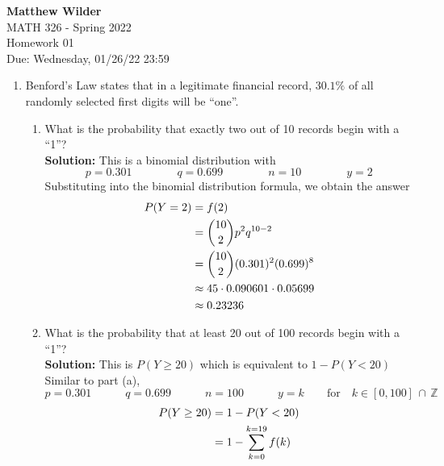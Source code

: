 \documentclass[12pt]{article}
\begin{document}
\pagestyle{fancy}
\fancyhf{}

\noindent \textbf{Matthew Wilder}\\MATH 326 - Spring 2022 \\
Homework 01 \\
Due: Wednesday, 01/26/22 23:59\\
\begin{enumerate}
    \item Benford's Law states that in a legitimate financial record, $30.1 \%$ of all randomly selected first digits will be \textquotedblleft one\textquotedblright.
    \begin{enumerate}
        \item What is the probability that exactly two out of 10 records begin with a \textquotedblleft 1\textquotedblright? \vspace{0.15in}\\
        \textbf{Solution:} This is a binomial distribution with
        $$p = 0.301 \qquad\qquad q = 0.699 \qquad\qquad n = 10 \qquad\qquad y = 2$$
        Substituting into the binomial distribution formula, we obtain the answer
        \begin{align}
            P(Y=2) &= f(2)\notag\\
            &= \binom{10}{2}p^2 q^{10-2} \notag\\
            &= \binom{10}{2}(0.301)^2  (0.699)^{8} \notag\\
            &\approx 45 \cdot 0.090601 \cdot 0.05699 \notag\\
            &\approx 0.23236\notag
        \end{align}
        \vspace{0.15in}
        \item What is the probability that at least 20 out of 100 records begin with a \textquotedblleft 1\textquotedblright?
        \vspace{0.15in}\\
        \textbf{Solution:} This is $P(Y \geq 20)$ which is equivalent to $1 - P(Y < 20)$ Similar to part (a),
        $$p = 0.301 \qquad\quad q = 0.699 \qquad\quad n = 100 \qquad\quad y = k \qquad \text{for} \quad k \in [0,100] \,\cap\, \mathbb{Z}$$
        \begin{align}
            P(Y \geq 20 ) &= 1 - P(Y < 20) \notag \\
            &= 1 - \sum_{k=0}^{k=19} f(k) \notag\\

\end{align}
\end{enumerate}
\end{enumerate}
\end{document}
